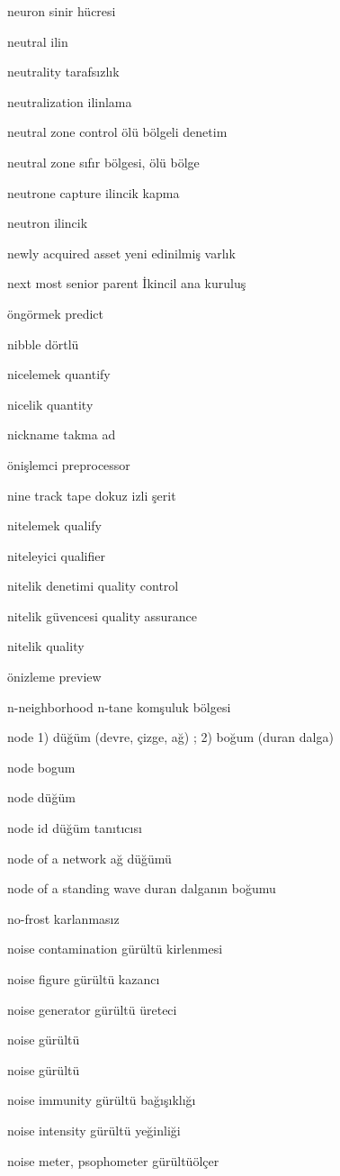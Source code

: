 \documentclass[12pt,fleqn]{article}\usepackage{../../common}
\begin{document}
neuron sinir hücresi

neutral ilin

neutrality tarafsızlık

neutralization ilinlama

neutral zone control ölü bölgeli denetim

neutral zone sıfır bölgesi, ölü bölge

neutrone capture ilincik kapma

neutron ilincik

newly acquired asset yeni edinilmiş varlık

next most senior parent İkincil ana kuruluş

öngörmek predict

nibble dörtlü

nicelemek quantify

nicelik quantity

nickname takma ad

önişlemci preprocessor

nine track tape dokuz izli şerit

nitelemek qualify

niteleyici qualifier

nitelik denetimi quality control

nitelik güvencesi quality assurance

nitelik quality

önizleme preview

n-neighborhood n-tane komşuluk bölgesi

node 1) düğüm (devre, çizge, ağ) ; 2) boğum (duran dalga)

node bogum

node düğüm

node id düğüm tanıtıcısı

node of a network ağ düğümü

node of a standing wave duran dalganın boğumu

no-frost karlanmasız

noise contamination gürültü kirlenmesi

noise figure gürültü kazancı

noise generator gürültü üreteci

noise gürültü

noise gürültü

noise immunity gürültü bağışıklığı

noise intensity gürültü yeğinliği

noise meter, psophometer gürültüölçer
\end{document}
